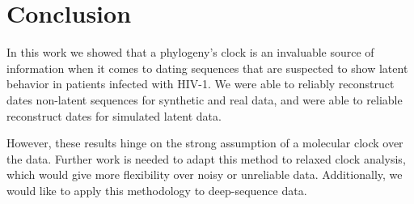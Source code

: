 \section{Conclusion} \label{sec:conclusion}
In this work we showed that a phylogeny's clock is an invaluable source of information when it comes to dating sequences that are suspected to show latent behavior in patients infected with HIV-1. 
We were able to reliably reconstruct dates non-latent sequences for synthetic and real data, and were able to reliable reconstruct dates for simulated latent data. 

However, these results hinge on the strong assumption of a molecular clock over the data. 
Further work is needed to adapt this method to relaxed clock analysis, which would give more flexibility over noisy or unreliable data. 
Additionally, we would like to apply this methodology to deep-sequence data.

